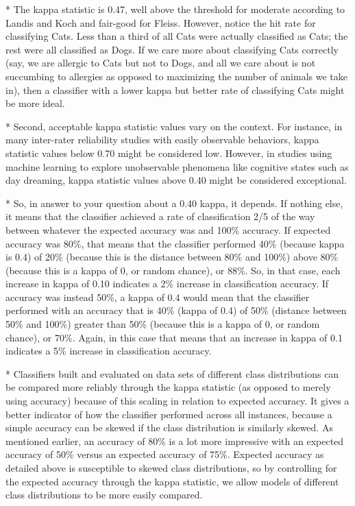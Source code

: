 
* The kappa statistic is 0.47, well above the threshold for moderate according to Landis and Koch and fair-good for Fleiss. However, notice the hit rate for classifying Cats. Less than a third of all Cats were actually classified as Cats; the rest were all classified as Dogs. If we care more about classifying Cats correctly (say, we are allergic to Cats but not to Dogs, and all we care about is not succumbing to allergies as opposed to maximizing the number of animals we take in), then a classifier with a lower kappa but better rate of classifying Cats might be more ideal.

* Second, acceptable kappa statistic values vary on the context. For instance, in many inter-rater reliability studies with easily observable behaviors, kappa statistic values below 0.70 might be considered low. However, in studies using machine learning to explore unobservable phenomena like cognitive states such as day dreaming, kappa statistic values above 0.40 might be considered exceptional.

* So, in answer to your question about a 0.40 kappa, it depends. If nothing else, it means that the classifier achieved a rate of classification 2/5 of the way between whatever the expected accuracy was and 100\% accuracy. If expected accuracy was 80\%, that means that the classifier performed 40\% (because kappa is 0.4) of 20\% (because this is the distance between 80\% and 100\%) above 80\% (because this is a kappa of 0, or random chance), or 88\%. So, in that case, each increase in kappa of 0.10 indicates a 2\% increase in classification accuracy. If accuracy was instead 50\%, a kappa of 0.4 would mean that the classifier performed with an accuracy that is 40\% (kappa of 0.4) of 50\% (distance between 50\% and 100\%) greater than 50\% (because this is a kappa of 0, or random chance), or 70\%. Again, in this case that means that an increase in kappa of 0.1 indicates a 5\% increase in classification accuracy.

* Classifiers built and evaluated on data sets of different class distributions can be compared more reliably through the kappa statistic (as opposed to merely using accuracy) because of this scaling in relation to expected accuracy. It gives a better indicator of how the classifier performed across all instances, because a simple accuracy can be skewed if the class distribution is similarly skewed. As mentioned earlier, an accuracy of 80\% is a lot more impressive with an expected accuracy of 50\% versus an expected accuracy of 75\%. Expected accuracy as detailed above is susceptible to skewed class distributions, so by controlling for the expected accuracy through the kappa statistic, we allow models of different class distributions to be more easily compared.

